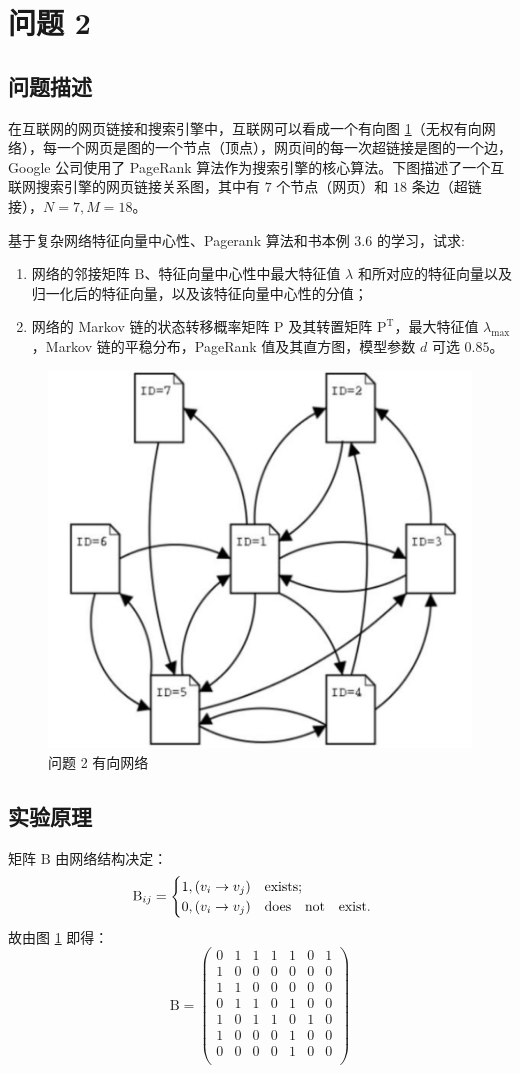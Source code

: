 \documentclass{article}
\begin{document}
\section{问题 2}

\subsection{问题描述}

在互联网的网页链接和搜索引擎中，互联网可以看成一个有向图 \ref{fig:2}（无权有向网络），每一个网页是图的一个节点（顶点），网页间的每一次超链接是图的一个边，Google 公司使用了 PageRank 算法作为搜索引擎的核心算法。下图描述了一个互联网搜索引擎的网页链接关系图，其中有 $7$ 个节点（网页）和 $18$ 条边（超链接），$N=7,M=18$。

基于复杂网络特征向量中心性、Pagerank 算法和书本例 3.6 的学习，试求:
\begin{enumerate}
    \item 网络的邻接矩阵 $\mathrm{B}$、特征向量中心性中最大特征值 $\lambda$ 和所对应的特征向量以及归一化后的特征向量，以及该特征向量中心性的分值；
    \item 网络的 Markov 链的状态转移概率矩阵 $\mathrm{P}$ 及其转置矩阵 $\mathrm{P}^{\mathrm{T}}$，最大特征值 $\lambda_{\mathrm{max}}$，Markov 链的平稳分布，PageRank 值及其直方图，模型参数 $d$ 可选 $0.85$。
\end{enumerate}

\begin{figure}[ht]
    \label{fig:2}
    \centering
    \includegraphics[width=.4\textwidth]{fig2.png}
    \caption{问题 2 有向网络}
\end{figure}

\subsection{实验原理}

矩阵 $\mathrm{B}$ 由网络结构决定：
$$
{\mathrm{B}}_{ij}=
\begin{cases}
    1, (v_i\to v_j)\quad {\text{exists}};\\
    0, (v_i\to v_j)\quad {\text{does\quad not\quad exist}}.
\end{cases}
$$
故由图 \ref{fig:2} 即得：
$$
{\mathrm{B}}=
\begin{pmatrix}
    0&1&1&1&1&0&1\\
    1&0&0&0&0&0&0\\
    1&1&0&0&0&0&0\\
    0&1&1&0&1&0&0\\
    1&0&1&1&0&1&0\\
    1&0&0&0&1&0&0\\
    0&0&0&0&1&0&0\\
\end{pmatrix}
$$
\end{document}
